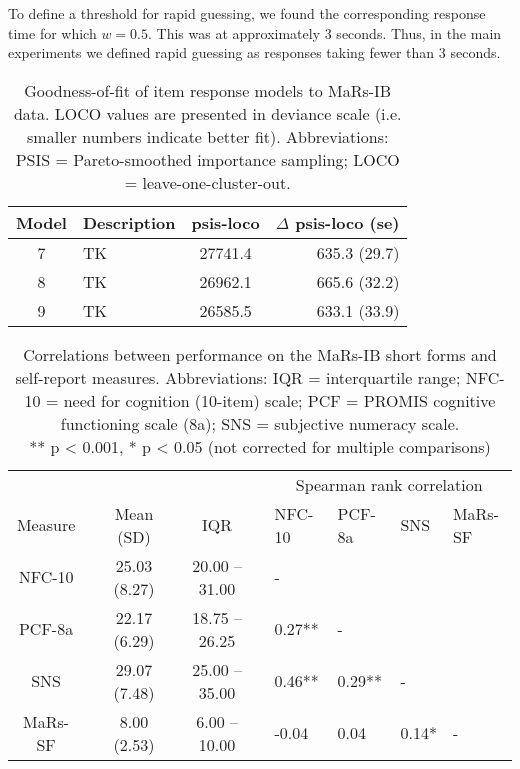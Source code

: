 \documentclass[a4paper,man,natbib]{apa6}
\begin{document}
To define a threshold for rapid guessing, we found the corresponding response time for which $w = 0.5$. This was at approximately 3 seconds. Thus, in the main experiments we defined rapid guessing as responses taking fewer than 3 seconds. 




\begin{table}
    \centering
    \begin{tabular*}{\textwidth}{clcr}
    \toprule
    Model & Description & psis-loco & $\Delta$ psis-loco (se) \\
    \midrule
    7 & TK  & 27741.4 & 635.3 (29.7) \\
    8 & TK  & 26962.1 & 665.6 (32.2) \\
    9 & TK & 26585.5 & 633.1 (33.9) \\
    \bottomrule
    \end{tabular*}
    \caption{\label{tab:2}\normalfont Goodness-of-fit of item response models to MaRs-IB data. LOCO values are presented in deviance scale (i.e. smaller numbers indicate better fit). Abbreviations: PSIS = Pareto-smoothed importance sampling; LOCO = leave-one-cluster-out.}
    \label{table:2}
\end{table}

\begin{table}
\centering
\begin{tabular*}{\textwidth}{ccccccllll}
\toprule
 & & & & & & \multicolumn{4}{c}{Spearman rank correlation} \\
\cmidrule(lr){7-10}
Measure & & Mean (SD) & & IQR & &  NFC-10 & PCF-8a & SNS & MaRs-SF \\
\midrule
NFC-10 & & 25.03 (8.27) & & 20.00 -- 31.00 & & - &  &  & \\
PCF-8a   &  & 22.17 (6.29) & & 18.75 -- 26.25 & & 0.27** &  - &  &  \\
SNS   &  & 29.07 (7.48) & & 25.00 -- 35.00 & & 0.46** &  0.29** &  - &   \\
MaRs-SF & &   8.00 (2.53) & &   6.00 -- 10.00 & & -0.04 &  0.04 &  0.14* &  - \\
\bottomrule
\end{tabular*}
\captionsetup{width=1.\textwidth}
\caption{\normalfont Correlations between performance on the MaRs-IB short forms and self-report measures. Abbreviations: IQR = interquartile range; NFC-10 = need for cognition (10-item) scale; PCF = PROMIS cognitive functioning scale (8a); SNS = subjective numeracy scale. \\ ** p < 0.001,  * p < 0.05 (not corrected for multiple comparisons)}
\end{table}
\end{document}
